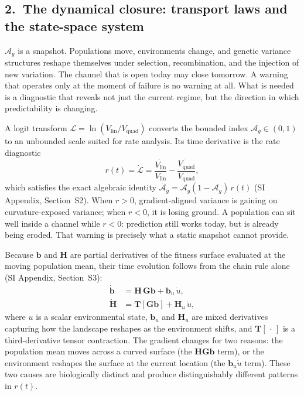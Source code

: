 \documentclass[9pt,twocolumn,twoside]{pnas-new}
\newcommand{\vect}[1]{\boldsymbol{#1}}
\newcommand{\mat}[1]{\mathbf{#1}}
\newcommand{\Ag}{\mathcal{A}_{g}}
\newcommand{\Vlin}{V_{\mathrm{lin}}}
\newcommand{\Vquad}{V_{\mathrm{quad}}}
\newcommand{\CalL}{\mathcal{L}}
\begin{document}
\subsection*{2.~The dynamical closure: transport laws and the
             state-space system}

$\Ag$ is a snapshot.
Populations move, environments change, and genetic variance
structures reshape themselves under selection, recombination, and
the injection of new variation.
The channel that is open today may close tomorrow.
A warning that operates only at the moment of failure is no warning
at all.
What is needed is a diagnostic that reveals not just the current
regime, but the direction in which predictability is changing.

A logit transform $\CalL = \ln(\Vlin/\Vquad)$ converts the bounded
index $\Ag \in (0,1)$ to an unbounded scale suited for rate
analysis.
Its time derivative is the rate diagnostic
\begin{equation}
r(t) = \dot{\CalL}
     = \frac{\dot{\Vlin}}{\Vlin} - \frac{\dot{\Vquad}}{\Vquad},
\label{eq:r}
\end{equation}
which satisfies the exact algebraic identity
$\dot{\Ag} = \Ag(1-\Ag)\,r(t)$ (SI Appendix, Section~S2).
When $r > 0$, gradient-aligned variance is gaining on
curvature-exposed variance; when $r < 0$, it is losing ground.
A population can sit well inside a channel while $r < 0$: prediction
still works today, but is already being eroded.
That warning is precisely what a static snapshot cannot provide.

Because $\vect{b}$ and $\mat{H}$ are partial derivatives of the
fitness surface evaluated at the moving population mean, their time
evolution follows from the chain rule alone (SI Appendix,
Section~S3):
\begin{align}
\dot{\vect{b}} &= \mat{H}\,\mat{G}\vect{b}
                + \vect{b}_u\,\dot{u},
\label{eq:bdot} \\
\dot{\mat{H}}  &= \mat{T}[\mat{G}\vect{b}]
                + \mat{H}_u\,\dot{u},
\label{eq:Hdot}
\end{align}
where $u$ is a scalar environmental state, $\vect{b}_u$ and
$\mat{H}_u$ are mixed derivatives capturing how the landscape
reshapes as the environment shifts, and $\mat{T}[\,\cdot\,]$
is a third-derivative tensor contraction.
The gradient changes for two reasons: the population mean moves
across a curved surface (the $\mat{H}\mat{G}\vect{b}$ term), or
the environment reshapes the surface at the current location
(the $\vect{b}_u\dot{u}$ term).
These two causes are biologically distinct and produce
distinguishably different patterns in $r(t)$.
\end{document}
